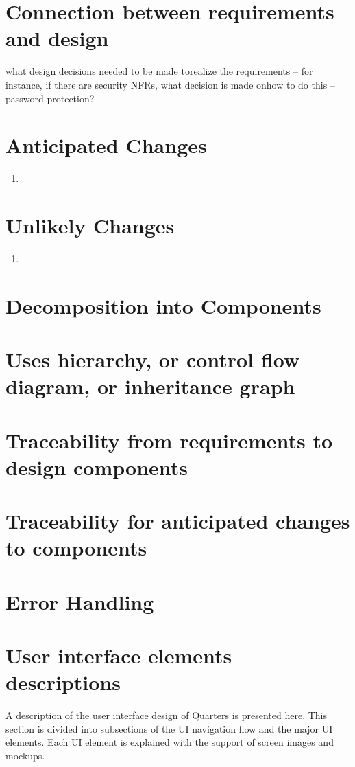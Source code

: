 \documentclass[12pt]{article}
\begin{document}
\section{Connection between requirements and design}
what design decisions needed to be made torealize the requirements – for instance, if there are security NFRs, what decision is made onhow to do this – password protection?

\section{Anticipated Changes}
\begin{enumerate}
\item{}
\end{enumerate}

\section{Unlikely Changes}
\begin{enumerate}
\item{}
\end{enumerate}

%
\section{Decomposition into Components}

%
\section{Uses hierarchy, or control flow diagram, or inheritance graph}

%
\section{Traceability from requirements to design components}

%
\section{Traceability for anticipated changes to components}

%
\section{Error Handling}

%
\section{User interface elements descriptions}
A description of the user interface design of Quarters is presented here. This section is divided into subsections of the UI navigation flow and the major UI elements. Each UI element is explained with the support of screen images and mockups.
\end{document}
